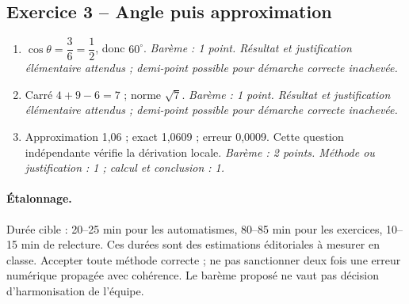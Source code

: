 \subsection*{Exercice 3 -- Angle puis approximation}
\begin{enumerate}
\item $\cos \theta =\dfrac{3}{6}=\dfrac{1}{2}$, donc $60^\circ$. \textit{Barème : 1 point. Résultat et justification élémentaire attendus ; demi-point possible pour démarche correcte inachevée.}
\item Carré $4+9-6=7$ ; norme $\sqrt7$. \textit{Barème : 1 point. Résultat et justification élémentaire attendus ; demi-point possible pour démarche correcte inachevée.}
\item Approximation 1,06 ; exact 1,0609 ; erreur 0,0009. Cette question indépendante vérifie la dérivation locale. \textit{Barème : 2 points. Méthode ou justification : 1 ; calcul et conclusion : 1.}
\end{enumerate}
\paragraph{Étalonnage.} Durée cible : 20–25 min pour les automatismes, 80–85 min pour les exercices, 10–15 min de relecture. Ces durées sont des estimations éditoriales à mesurer en classe. Accepter toute méthode correcte ; ne pas sanctionner deux fois une erreur numérique propagée avec cohérence. Le barème proposé ne vaut pas décision d’harmonisation de l’équipe.
